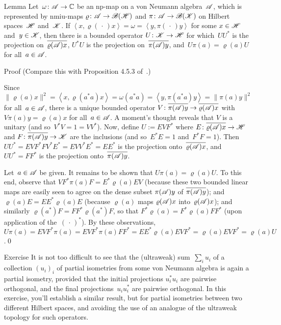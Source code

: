 \documentclass[a]{subfiles}
\begin{document}
\begin{parsec}%
\begin{point}{Lemma}%
Let~$\omega\colon \mathscr{A}\to\mathbb{C}$
be an np-map on a von Neumann algebra~$\mathscr{A}$,
which is represented by nmiu-maps
$\varrho\colon \mathscr{A}\to\mathscr{B}(\mathscr{H})$
and $\pi\colon \mathscr{A}\to\mathscr{B}(\mathscr{K})$
on Hilbert spaces~$\mathscr{H}$ and~$\mathscr{K}$.
If $\left<x,\varrho(\,\cdot\,)x\right>
=\omega=\left<y,\pi(\,\cdot\,)y\right>$
for some  $x\in\mathscr{H}$ and~$y\in\mathscr{K}$,
then there is a bounded operator $U\colon \mathscr{K}\to\mathscr{H}$
for which~$UU^*$ is the projection
on~$\overline{\varrho(\mathscr{A})x}$,
$U^*U$ is the projection
on~$\overline{\pi(\mathscr{A})y}$,
and~$U\pi(a)=\varrho(a)U$
for all~$a\in\mathscr{A}$.
\begin{point}{Proof}%
(Compare this with Proposition 4.5.3 of~\cite{kr}.)

Since $\|\varrho(a)x\|^2
= \left<x,\varrho(a^*a)x\right>
=\omega(a^*a)=\left<y,\pi(a^*a)y\right>
= \|\pi(a)y\|^2$ for all~$a\in\mathscr{A}$,
there is a unique bounded operator $V\colon \overline{\pi(\mathscr{A})y}
\to \overline{\varrho(\mathscr{A})x}$
with $V\pi(a)y = \varrho(a)x$ for all~$a\in\mathscr{A}$.
A moment's thought reveals
that $V$ is a unitary (and so~$V^*V=1=VV^*$).
Now, define $U:=EVF^*$
where $E\colon \overline{\varrho(\mathscr{A})x}\to\mathscr{H}$
and $F\colon \overline{\pi(\mathscr{A})y}\to\mathscr{K}$
are the inclusions
(and so~$E^*E=1$ and~$F^*F=1$).
Then $UU^*= EVF^*FV^*E^*=EVV^*E^*=EE^*$
is the projection onto~$\overline{\varrho(\mathscr{A})x}$,
and $UU^*=FF^*$
is the projection onto~$\overline{\pi(\mathscr{A})y}$.

Let~$a\in\mathscr{A}$ be given.
It remains to be shown that
$U\pi(a)=\varrho(a)U$.
To this end,
observe that
$V F^* \pi(a) F = E^* \varrho(a) E V$
(because 
these two bounded linear maps
are easily seen to
agree on the dense subset $\pi(\mathscr{A})y$
of $\overline{\pi(\mathscr{A})y}$);
and $\varrho(a)E = EE^*\varrho(a)E$
(because $\varrho(a)$ maps $\varrho(\mathscr{A})x$ into~$\varrho(\mathscr{A})x$);
and similarly $\varrho(a^*)F=FF^*\varrho(a^*) F$,
so that $F^*\varrho(a) = F^* \varrho(a) FF^*$
(upon application of the~$(\,\cdot\,)^*$).
By these observations,  $U\pi(a)=
EVF^*\pi(a)=EVF^*\pi(a) FF^*
= EE^*\varrho(a)EVF^*
= \varrho(a)EVF^*
= \varrho(a)U$.\qed
\end{point}
\end{point}
\begin{point}{Exercise}%
It is not too difficult 
to see that the (ultraweak) sum~$\sum_i u_i$
of a collection $(u_i)_i$ 
of partial isometries from some von Neumann algebra
is again a partial isometry, 
provided that the initial projections $u_i^*u_i$
are pairwise orthogonal,
and the final projections~$u_iu_i^*$ are pairwise orthogonal.
In this exercise, you'll establish a similar result,
but for partial isometries between two different Hilbert spaces,
and avoiding the use of an analogue of 
the ultraweak topology for such operators.


\end{point}
\end{parsec}
\end{document}
